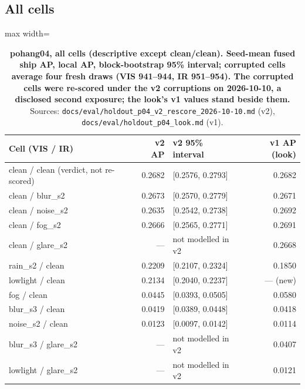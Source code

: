 \documentclass[10pt]{article}
\begin{document}
\subsection{All cells}\label{app:K.2}
\begin{table}[htbp]
\centering
\small
\caption{\textbf{pohang04, all cells (descriptive except clean/clean). Seed-mean fused ship AP, local AP, block-bootstrap 95\% interval; corrupted cells average four fresh draws (VIS 941--944, IR 951--954). The corrupted cells were re-scored under the v2 corruptions on 2026-10-10, a disclosed second exposure; the look's v1 values stand beside them.} Sources: \texttt{docs/\allowbreak{}eval/\allowbreak{}holdout\_\allowbreak{}p04\_\allowbreak{}v2\_\allowbreak{}rescore\_\allowbreak{}2026-10-10.md} (v2), \texttt{docs/\allowbreak{}eval/\allowbreak{}holdout\_\allowbreak{}p04\_\allowbreak{}look.md} (v1).}
\label{tab:7}
\begin{adjustbox}{max width=\linewidth}
\begin{tabular}{lrlr}
\toprule
Cell (VIS / IR) & v2 AP & v2 95\% interval & v1 AP (look) \\
\midrule
clean / clean (verdict, not re-scored) & 0.2682 & [0.2576, 0.2793] & 0.2682 \\
clean / blur\_s2 & 0.2673 & [0.2570, 0.2779] & 0.2671 \\
clean / noise\_s2 & 0.2635 & [0.2542, 0.2738] & 0.2692 \\
clean / fog\_s2 & 0.2666 & [0.2565, 0.2771] & 0.2691 \\
clean / glare\_s2 & --- & not modelled in v2 & 0.2668 \\
rain\_s2 / clean & 0.2209 & [0.2107, 0.2324] & 0.1850 \\
lowlight / clean & 0.2134 & [0.2040, 0.2237] & --- (new) \\
fog / clean & 0.0445 & [0.0393, 0.0505] & 0.0580 \\
blur\_s3 / clean & 0.0419 & [0.0389, 0.0448] & 0.0418 \\
noise\_s2 / clean & 0.0123 & [0.0097, 0.0142] & 0.0114 \\
blur\_s3 / glare\_s2 & --- & not modelled in v2 & 0.0407 \\
lowlight / glare\_s2 & --- & not modelled in v2 & 0.0121 \\
\bottomrule
\end{tabular}
\end{adjustbox}
\end{table}
\FloatBarrier
\end{document}
